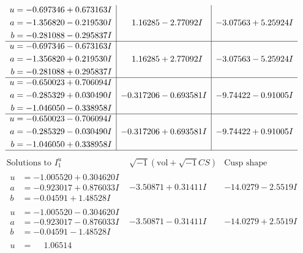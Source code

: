 \documentclass[1p]{elsarticle_modified}
\theoremstyle{definition}
\newcommand{\I}{\sqrt{-1}}
\begin{document}
$$\begin{array}{c|c|c}
\begin{aligned}
u &= -0.697346 + 0.673163 I \\
a &= -1.356820 - 0.219530 I \\
b &= -0.281088 - 0.295837 I\end{aligned}
 & \phantom{-}1.16285 - 2.77092 I & -3.07563 + 5.25924 I \\ \hline\begin{aligned}
u &= -0.697346 - 0.673163 I \\
a &= -1.356820 + 0.219530 I \\
b &= -0.281088 + 0.295837 I\end{aligned}
 & \phantom{-}1.16285 + 2.77092 I & -3.07563 - 5.25924 I \\ \hline\begin{aligned}
u &= -0.650023 + 0.706094 I \\
a &= -0.285329 + 0.030490 I \\
b &= -1.046050 - 0.338958 I\end{aligned}
 & -0.317206 - 0.693581 I & -9.74422 - 0.91005 I \\ \hline\begin{aligned}
u &= -0.650023 - 0.706094 I \\
a &= -0.285329 - 0.030490 I \\
b &= -1.046050 + 0.338958 I\end{aligned}
 & -0.317206 + 0.693581 I & -9.74422 + 0.91005 I\\
 \hline 
 \end{array}$$\newpage$$\begin{array}{c|c|c}  
\text{Solutions to }I^u_{1}& \I (\text{vol} + \sqrt{-1}CS) & \text{Cusp shape}\\
 \hline 
\begin{aligned}
u &= -1.005520 + 0.304620 I \\
a &= -0.923017 + 0.876033 I \\
b &= -0.04591 + 1.48528 I\end{aligned}
 & -3.50871 + 0.31411 I & -14.0279 - 2.5519 I \\ \hline\begin{aligned}
u &= -1.005520 - 0.304620 I \\
a &= -0.923017 - 0.876033 I \\
b &= -0.04591 - 1.48528 I\end{aligned}
 & -3.50871 - 0.31411 I & -14.0279 + 2.5519 I \\ \hline\begin{aligned}
u &= \phantom{-}1.06514\phantom{ +0.000000I} \\

\end{aligned}
\end{array}$$
\end{document}
